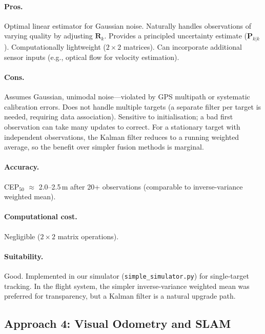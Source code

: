 \paragraph{Pros.}
Optimal linear estimator for Gaussian noise.  Naturally handles observations of varying quality by adjusting $\mathbf{R}_k$.  Provides a principled uncertainty estimate ($\mathbf{P}_{k|k}$).  Computationally lightweight ($2\times2$ matrices).  Can incorporate additional sensor inputs (e.g., optical flow for velocity estimation).

\paragraph{Cons.}
Assumes Gaussian, unimodal noise---violated by GPS multipath or systematic calibration errors.  Does not handle multiple targets (a separate filter per target is needed, requiring data association).  Sensitive to initialisation; a bad first observation can take many updates to correct.  For a stationary target with independent observations, the Kalman filter reduces to a running weighted average, so the benefit over simpler fusion methods is marginal.

\paragraph{Accuracy.}  CEP$_{50}$ $\approx$ 2.0--2.5\,m after 20+ observations (comparable to inverse-variance weighted mean).

\paragraph{Computational cost.}  Negligible ($2\times2$ matrix operations).

\paragraph{Suitability.}  Good.  Implemented in our simulator (\texttt{simple\_simulator.py}) for single-target tracking.  In the flight system, the simpler inverse-variance weighted mean was preferred for transparency, but a Kalman filter is a natural upgrade path.

\subsection{Approach 4: Visual Odometry and SLAM}\label{sec:approach-slam}

